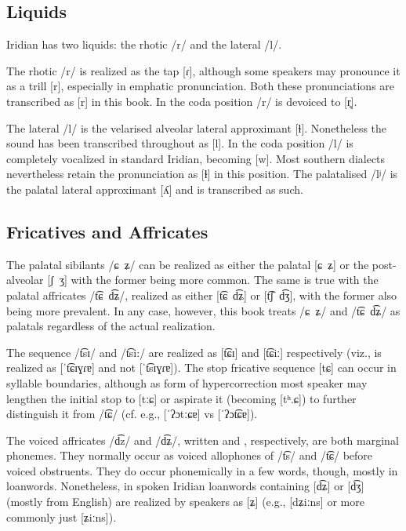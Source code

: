 \subsection{Liquids}

Iridian has two liquids: the rhotic /r/ and the lateral /l/.

The rhotic /r/ is realized as the tap [ɾ], although some speakers may pronounce
it as a trill [r], especially in emphatic pronunciation. Both these
pronunciations are transcribed as [r] in this book. In the coda position /r/ is
devoiced to [r̥].

The lateral /l/ is  the velarised alveolar lateral approximant [ɫ]. Nonetheless
the sound has been transcribed throughout as [l]. In the coda position /l/ is
completely vocalized in standard Iridian, becoming [w]. Most southern dialects
nevertheless retain the pronunciation as [ɫ] in this position. The palatalised
/lʲ/ is the palatal lateral approximant [ʎ] and is transcribed as such.

\subsection{Fricatives and Affricates}

The palatal sibilants /ɕ~ʑ/ can be realized as either the palatal [ɕ~ʑ] or the
post-alveolar [ʃ~ʒ] with the former being more common. The same is true with the
palatal affricates /t͡ɕ~d͡ʑ/, realized as either [t͡ɕ~d͡ʑ] or [t͡ʃ~d͡ʒ], with
the former also being more prevalent. In any case, however, this book treats
/ɕ~ʑ/ and /t͡ɕ~d͡ʑ/ as palatals regardless of the actual realization.

The sequence /t͡sɪ/ and /t͡si:/ are realized as [t͡ɕɪ] and [t͡ɕiː] respectively
(viz.,  is realized as [ˈt͡ɕɪɣɾɐ] and not [ˈt͡sɪɣɾɐ]). The
stop fricative sequence [tɕ] can occur in syllable boundaries, although as form
of hypercorrection most speaker may lengthen the initial stop to [tːɕ] or
aspirate it (becoming [tʰ.ɕ]) to further distinguish it from /t͡ɕ/ (cf. e.g.,
 [ˈʔɔtːɕɐ] vs  [ˈʔɔt͡ɕɐ]).

The voiced affricates /d͡z/ and /d͡ʑ/, written  and ,
respectively, are both marginal phonemes. They normally occur as voiced
allophones of  /t͡s/ and /t͡ɕ/ before voiced obstruents. They do occur
phonemically in a few words, though, mostly in loanwords. Nonetheless, in spoken
Iridian loanwords containing [d͡ʑ] or [d͡ʒ] (mostly from English) are realized
by speakers as [ʑ] (e.g.,  [dʑiːns] or more commonly just
[ʑiːns]).


